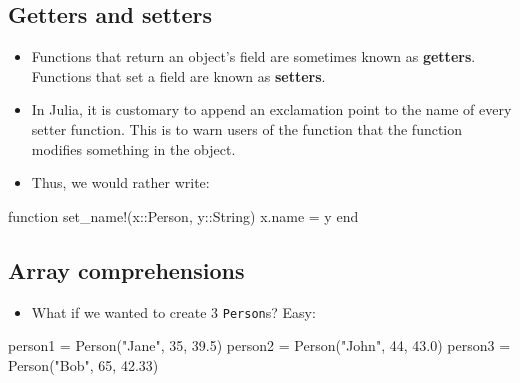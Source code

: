 \documentclass[
  letterpaper,
  DIV=11,
  numbers=noendperiod]{scrartcl}
\newenvironment{Shaded}{\begin{snugshade}}{\end{snugshade}}
\newcommand{\DataTypeTok}[1]{\textcolor[rgb]{0.68,0.00,0.00}{#1}}
\newcommand{\FloatTok}[1]{\textcolor[rgb]{0.68,0.00,0.00}{#1}}
\newcommand{\FunctionTok}[1]{\textcolor[rgb]{0.28,0.35,0.67}{#1}}
\newcommand{\KeywordTok}[1]{\textcolor[rgb]{0.00,0.23,0.31}{#1}}
\newcommand{\NormalTok}[1]{\textcolor[rgb]{0.00,0.23,0.31}{#1}}
\newcommand{\OperatorTok}[1]{\textcolor[rgb]{0.37,0.37,0.37}{#1}}
\newcommand{\StringTok}[1]{\textcolor[rgb]{0.13,0.47,0.30}{#1}}
\providecommand{\tightlist}{%
  \setlength{\itemsep}{0pt}\setlength{\parskip}{0pt}}\usepackage{longtable,booktabs,array}
\begin{document}
\subsection{Getters and setters}\label{getters-and-setters}

\begin{itemize}
\tightlist
\item
  Functions that return an object's field are sometimes known as
  \textbf{getters}. Functions that set a field are known as
  \textbf{setters}.
\item
  In Julia, it is customary to append an exclamation point to the name
  of every setter function. This is to warn users of the function that
  the function modifies something in the object.
\item
  Thus, we would rather write:
\end{itemize}

\begin{Shaded}
\begin{Highlighting}[]
\KeywordTok{function} \FunctionTok{set\_name!}\NormalTok{(x}\OperatorTok{::}\DataTypeTok{Person}\NormalTok{, y}\OperatorTok{::}\DataTypeTok{String}\NormalTok{)}
\NormalTok{  x.name }\OperatorTok{=}\NormalTok{ y}
\KeywordTok{end}
\end{Highlighting}
\end{Shaded}

\subsection{Array comprehensions}\label{array-comprehensions}

\begin{itemize}
\tightlist
\item
  What if we wanted to create 3 \texttt{Person}s? Easy:
\end{itemize}

\begin{Shaded}
\begin{Highlighting}[]
\NormalTok{person1 }\OperatorTok{=} \FunctionTok{Person}\NormalTok{(}\StringTok{"Jane"}\NormalTok{, }\FloatTok{35}\NormalTok{, }\FloatTok{39.5}\NormalTok{)}
\NormalTok{person2 }\OperatorTok{=} \FunctionTok{Person}\NormalTok{(}\StringTok{"John"}\NormalTok{, }\FloatTok{44}\NormalTok{, }\FloatTok{43.0}\NormalTok{)}
\NormalTok{person3 }\OperatorTok{=} \FunctionTok{Person}\NormalTok{(}\StringTok{"Bob"}\NormalTok{, }\FloatTok{65}\NormalTok{, }\FloatTok{42.33}\NormalTok{)}
\end{Highlighting}
\end{Shaded}
\end{document}
